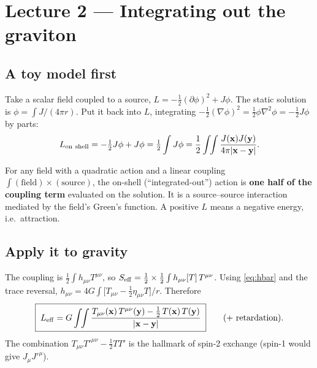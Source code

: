 \documentclass[11pt]{article}
\newcommand{\bx}{\mathbf{x}}\newcommand{\by}{\mathbf{y}}\newcommand{\bv}{\mathbf{v}}
\begin{document}
\section{Lecture 2 --- Integrating out the graviton}

\subsection{A toy model first}
Take a scalar field coupled to a source, $L=-\tfrac12(\partial\phi)^2+J\phi$. The static solution is $\phi=\int J/(4\pi r)$. Put it back into $L$, integrating $-\tfrac12(\nabla\phi)^2=\tfrac12\phi\nabla^2\phi=-\tfrac12J\phi$ by parts:
\[
L_{\rm on\ shell}=-\tfrac12J\phi+J\phi=\tfrac12\int J\phi=\frac12\int\!\!\int\frac{J(\bx)J(\by)}{4\pi|\bx-\by|}.
\]
\begin{result}[Rule]
For any field with a quadratic action and a linear coupling $\int(\text{field})\times(\text{source})$, the on-shell (``integrated-out'') action is \textbf{one half of the coupling term} evaluated on the solution. It is a source--source interaction mediated by the field's Green's function. A positive $L$ means a negative energy, i.e.\ attraction.
\end{result}

\subsection{Apply it to gravity}
The coupling is $\tfrac12\int h_{\mu\nu}T^{\mu\nu}$, so $S_{\rm eff}=\tfrac12\times\tfrac12\int h_{\mu\nu}[T]\,T^{\mu\nu}$. Using \eqref{eq:hbar} and the trace reversal, $h_{\mu\nu}=4G\int\big[T_{\mu\nu}-\tfrac12\eta_{\mu\nu}T\big]/r$. Therefore
\begin{equation}
\boxed{\;L_{\rm eff}=G\int\!\!\int\frac{T_{\mu\nu}(\bx)\,T^{\mu\nu}(\by)-\tfrac12\,T(\bx)\,T(\by)}{|\bx-\by|}\;}\qquad(+\ \text{retardation}).
\label{eq:Leff}
\end{equation}
The combination $T_{\mu\nu}T'^{\mu\nu}-\tfrac12TT'$ is the hallmark of spin-2 exchange (spin-1 would give $J_\mu J'^\mu$).
\end{document}
